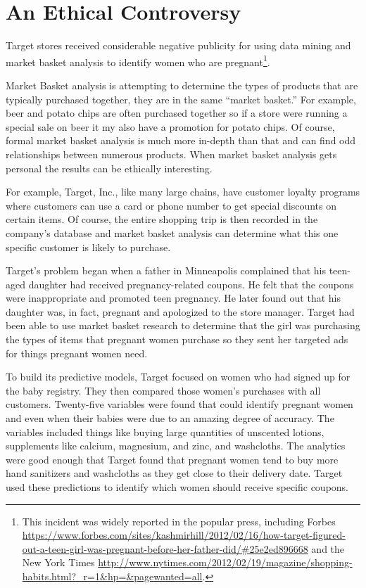 \section{An Ethical Controversy}

Target stores received considerable negative publicity for using data mining and market basket analysis to identify women who are pregnant\footnote{This incident was widely reported in the popular press, including Forbes \url{https://www.forbes.com/sites/kashmirhill/2012/02/16/how-target-figured-out-a-teen-girl-was-pregnant-before-her-father-did/\#25e2ed896668} and the New York Times \url{http://www.nytimes.com/2012/02/19/magazine/shopping-habits.html?_r=1&hp=&pagewanted=all}.}. 

Market Basket analysis is attempting to determine the types of products that are typically purchased together, they are in the same ``market basket.'' For example, beer and potato chips are often purchased together so if a store were running a special sale on beer it my also have a promotion for potato chips. Of course, formal market basket analysis is much more in-depth than that and can find odd relationships between numerous products. When market basket analysis gets personal the results can be ethically interesting.

For example, Target, Inc., like many large chains, have customer loyalty programs where customers can use a card or phone number to get special discounts on certain items. Of course, the entire shopping trip is then recorded in the company's database and market basket analysis can determine what this one specific customer is likely to purchase.

Target's problem began when a father in Minneapolis complained that his teen-aged daughter had received pregnancy-related coupons. He felt that the coupons were inappropriate and promoted teen pregnancy. He later found out that his daughter was, in fact, pregnant and apologized to the store manager. Target had been able to use market basket research to determine that the girl was purchasing the types of items that pregnant women purchase so they sent her targeted ads for things pregnant women need.

To build its predictive models, Target focused on women who had signed up for the baby registry. They then compared those women’s purchases with all customers. Twenty-five variables were found that could identify pregnant women and even when their babies were due to an amazing degree of accuracy. The variables included things like buying large quantities of unscented lotions, supplements like calcium, magnesium, and zinc, and washcloths. The analytics were good enough that Target found that pregnant women tend to buy more hand sanitizers and washcloths as they get close to their delivery date. Target used these predictions to identify which women should receive specific coupons. 

